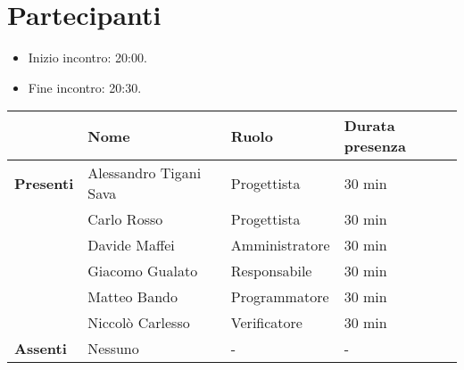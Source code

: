 \section*{Partecipanti}

\begin{itemize}
	\item Inizio incontro: 20:00.
	\item Fine incontro: 20:30.
\end{itemize}


\begin{center}
	\begin{tabular}{llll}
		                  & \textbf{Nome}          & \textbf{Ruolo} & \textbf{Durata presenza} \\
		\hline
		\textbf{Presenti} & Alessandro Tigani Sava & Progettista 	& 30 min	\\
		                  & Carlo Rosso            & Progettista	& 30 min	\\
		                  & Davide Maffei          & Amministratore	& 30 min	\\
		                  & Giacomo Gualato        & Responsabile	& 30 min	\\
		                  & Matteo Bando           & Programmatore	& 30 min	\\
		                  & Niccolò Carlesso       & Verificatore	& 30 min	\\
		\hline
		\textbf{Assenti}  & Nessuno                & -              & -		\\
	\end{tabular}
\end{center}
